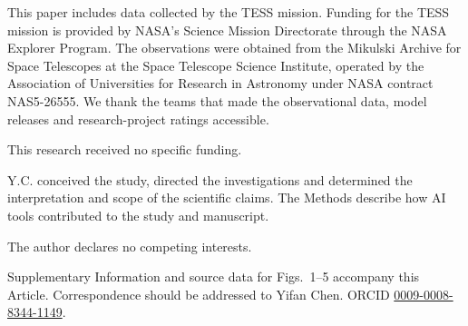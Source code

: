 This paper includes data collected by the TESS mission. Funding for the TESS mission is provided by NASA's Science Mission Directorate through the NASA Explorer Program. The observations were obtained from the Mikulski Archive for Space Telescopes at the Space Telescope Science Institute, operated by the Association of Universities for Research in Astronomy under NASA contract NAS5-26555. We thank the teams that made the observational data, model releases and research-project ratings accessible.

This research received no specific funding.

Y.C. conceived the study, directed the investigations and determined the interpretation and scope of the scientific claims. The Methods describe how AI tools contributed to the study and manuscript.

The author declares no competing interests.

Supplementary Information and source data for Figs.~1--5 accompany this Article. Correspondence should be addressed to Yifan Chen. ORCID \href{https://orcid.org/0009-0008-8344-1149}{0009-0008-8344-1149}.
